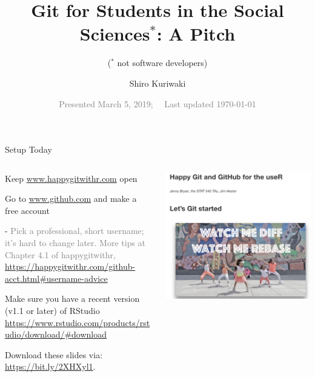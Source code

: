 \documentclass[ignorenonframetext, 10pt, aspectratio=169]{beamer}
\title{\textbf{\Large{Git for Students in the Social Sciences$^*$: A Pitch}}}
\subtitle{($^*$ not software developers)}
\author{Shiro Kuriwaki}
\date{\small \textcolor{gray}{Presented March 5, 2019;~~ Last updated \today}}
\begin{document}
\begin{frame}{Setup Today}
\begin{columns}[T]
\begin{column}{0.6\textwidth}
\begin{wideenumerate}
\item Keep  \url{www.happygitwithr.com} open
\item Go to \url{www.github.com} and make a free account
\begin{wideitemize}
\item[-] \textcolor{gray}{\footnotesize Pick a professional, short username; it's hard to change later. More tips at Chapter 4.1 of happygitwithr,  \url{https://happygitwithr.com/github-acct.html\#username-advice}}
\end{wideitemize}
\item Make sure you have a recent version (v1.1 or later) of RStudio \url{https://www.rstudio.com/products/rstudio/download/\#download}
\item Download these slides via: \url{https://bit.ly/2XHXyl1}.
\end{wideenumerate}
\end{column}
\begin{column}{0.4\textwidth}
\includegraphics[width = \linewidth]{happygit.png}
\end{column}
\end{columns}
\end{frame}
\end{document}
